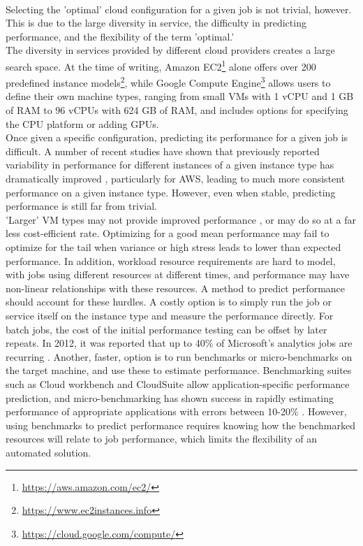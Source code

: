 \documentclass{article}
\begin{document}
\paragraph{}
Selecting the 'optimal' cloud configuration for a given job is not trivial, however. This is due to the large diversity in service, the difficulty in predicting performance, and the flexibility of the term 'optimal.' \\
The diversity in services provided by different cloud providers creates a large search space. At the time of writing, Amazon EC2\footnote{\url{https://aws.amazon.com/ec2/}} alone offers over 200 predefined instance models\footnote{\url{https://www.ec2instances.info}}, while Google Compute Engine\footnote{\url{https://cloud.google.com/compute/}} allows users to define their own machine types, ranging from small VMs with 1 vCPU and 1 GB of RAM to 96 vCPUs with 624 GB of RAM, and includes options for specifying the CPU platform or adding GPUs. \\
Once given a specific configuration, predicting its performance for a given job is difficult. A number of recent studies have shown that previously reported variability \cite{Leitner2014} in performance for different instances of a given instance type has dramatically improved \cite{Scheuner2018,Davatz2017,Laaber2019}, particularly for AWS, leading to much more consistent performance on a given instance type. However, even when stable, predicting performance is still far from trivial. \\ 'Larger' VM types may not provide improved performance \cite{Yadwadkar2017}, or may do so at a far less cost-efficient rate. Optimizing for a good mean performance may fail to optimize for the tail when variance or high stress leads to lower than expected performance. In addition, workload resource requirements are hard to model, with jobs using different resources at different times, and performance may have non-linear relationships with these resources\cite{Alipourfard2017}. A method to predict performance should account for these hurdles.
A costly option is to simply run the job or service itself on the instance type and measure the performance directly. For batch jobs, the cost of the initial performance testing can be offset by later repeats. In 2012, it was reported that up to 40\% of Microsoft's analytics jobs are recurring \cite{Agarwal2012,Ferguson2012b}. Another, faster, option is to run benchmarks or micro-benchmarks on the target machine, and use these to estimate performance. Benchmarking suites such as Cloud workbench \cite{Scheuner2018a} and CloudSuite \cite{Palit2016} allow application-specific performance prediction, and micro-benchmarking has shown success in rapidly estimating performance of appropriate applications with errors between 10-20\% \cite{Scheuner2018, Varghese2016a, Varghese2016}. However, using benchmarks to predict performance requires knowing how the benchmarked resources will relate to job performance, which limits the flexibility of an automated solution. \\
\end{document}
